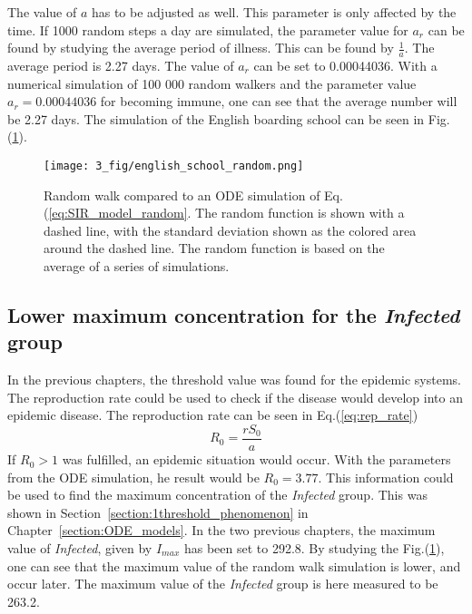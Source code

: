 \documentclass[%
twoside,                 %
final,                   %
chapterprefix=true,      %
open=right               %
10pt]{book}
\begin{document}
\vspace{3mm}




\vspace{3mm}


The value of $a$ has to be adjusted as well. This parameter is only affected by the time. If 1000 random steps a day are simulated, the parameter value for $a_r$ can be found by studying the average period of illness. This can be found by $\frac{1}{a}$. The average period is 2.27 days. The value of $a_r$ can be set to 0.00044036. With a numerical simulation of 100 000 random walkers and the parameter value $a_r=0.00044036$ for becoming immune, one can see that the average number will be 2.27 days. The simulation of the English boarding school can be seen in Fig.(\ref{fig:english_school_random}).


\begin{figure}[ht]
  \centerline{\texttt{[image: 3\_fig/english\_school\_random.png]}}
  \caption{
  \label{fig:english_school_random}Random walk compared to an ODE simulation of Eq.(\ref{eq:SIR_model_random}. The random function is shown with a dashed line, with the standard deviation shown as the colored area around the dashed line. The random function is based on the average of a series of simulations.
  }
\end{figure}


\subsection{Lower maximum concentration for the \emph{Infected} group}
In the previous chapters, the threshold value was found for the epidemic systems. The reproduction rate could be used to check if the disease would develop into an epidemic disease. The reproduction rate can be seen in Eq.(\ref{eq:rep_rate})
\begin{equation} \label{eq:rep_rate}
R_0 = \frac{rS_0}{a}
\end{equation}
If $R_0> 1$ was fulfilled, an epidemic situation would occur. With the parameters from the ODE simulation, he result would be $R_0 = 3.77$. This information could be used to find the maximum concentration of the \emph{Infected} group. This was shown in Section~\ref{section:1threshold_phenomenon} in Chapter~\ref{section:ODE_models}. In the two previous chapters, the maximum value of \emph{Infected}, given by $I_{max}$ has been set to 292.8. By studying the Fig.(\ref{fig:english_school_random}), one can see that the maximum value of the random walk simulation is lower, and occur later. The maximum value of the \emph{Infected} group is here measured to be 263.2. 
\end{document}
